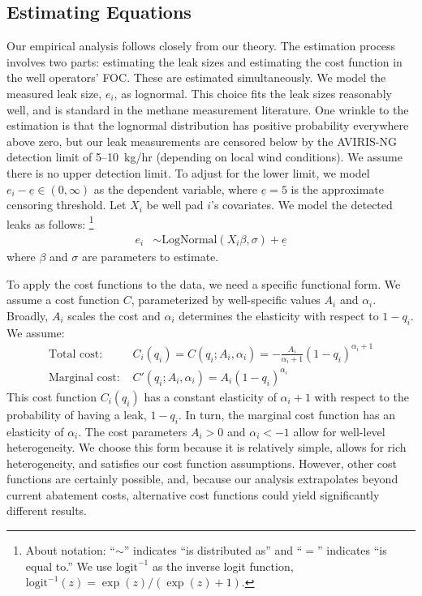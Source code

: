 \documentclass[12pt,oneside,letterpaper]{article}
\theoremstyle{definition}
\begin{document}
\begin{refsection}
\subsection{Estimating Equations}
\label{sec:estimating-equations}

Our empirical analysis follows closely from our theory.
The estimation process involves two parts: estimating the leak sizes and estimating the cost function in the well operators' \gls{FOC}.
These are estimated simultaneously.
We model the measured leak size, \(e_i\), as lognormal.
This choice fits the leak sizes reasonably well, and is standard in the methane measurement literature.
One wrinkle to the estimation is that the lognormal distribution has positive probability everywhere above zero, but our leak measurements are censored below by the \gls{AVIRIS-NG} detection limit of 5--10~kg/hr (depending on local wind conditions).
We assume there is no upper detection limit.
To adjust for the lower limit, we model \(e_i - \underline{e} \in (0, \infty)\) as the dependent variable, where \(\underline{e} = 5\) is the approximate censoring threshold.
Let \(X_i\) be well pad \(i\)'s covariates.
We model the detected leaks as follows:%
\footnote{%
About notation: ``\(\sim\)'' indicates ``is distributed as'' and ``\(=\)'' indicates ``is equal to.''
We use \(\text{logit}^{-1}\) as the inverse logit function,  \(\text{logit}^{-1}(z) = \exp(z) / (\exp(z) + 1)\).
}
\begin{align*}
e_i &\sim \text{LogNormal}(X_i \beta, \sigma) + \underline{e}
\end{align*}
where \(\beta\) and \(\sigma\) are parameters to estimate.



To apply the cost functions to the data, we need a specific functional form.
We assume a cost function \(C\), parameterized by well-specific values \(A_i\) and \(\alpha_i\).
Broadly, \(A_i\) scales the cost and \(\alpha_i\) determines the elasticity with respect to \(1 - q_i\).
We assume:
\begin{align*}
\text{Total cost: }& C_i(q_i) = C(q_i; A_i, \alpha_i) = -\frac{A_i}{\alpha_i + 1} (1 - q_i) ^{\alpha_i + 1}\\
\text{Marginal cost: }& C'(q_i; A_i,\alpha_i) = A_i (1 - q_i) ^{\alpha_i}
\end{align*}
This cost function \(C_i(q_i)\) has a constant elasticity of \(\alpha_i + 1\) with respect to the probability of having a leak, \(1 - q_i\).
In turn, the marginal cost function has an elasticity of \(\alpha_i\).
The cost parameters \(A_i > 0\) and \(\alpha_i < -1\) allow for well-level heterogeneity.
We choose this form because it is relatively simple, allows for rich heterogeneity, and satisfies our cost function assumptions.
However, other cost functions are certainly possible, and, because our analysis extrapolates beyond current abatement costs, alternative cost functions could yield significantly different results.



\end{refsection}
\end{document}
